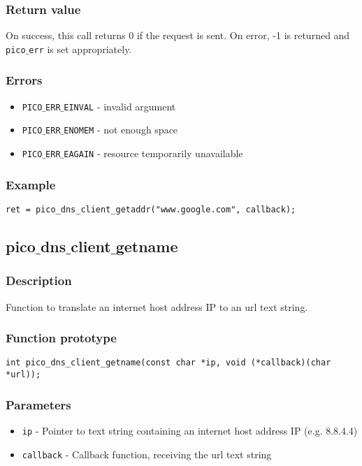 \subsubsection*{Return value}
On success, this call returns 0 if the request is sent.
On error, -1 is returned and \texttt{pico$\_$err} is set appropriately.

\subsubsection*{Errors}
\begin{itemize}[noitemsep]
\item \texttt{PICO$\_$ERR$\_$EINVAL} - invalid argument
\item \texttt{PICO$\_$ERR$\_$ENOMEM} - not enough space
\item \texttt{PICO$\_$ERR$\_$EAGAIN} - resource temporarily unavailable
\end{itemize}

\subsubsection*{Example}
\begin{verbatim}
ret = pico_dns_client_getaddr("www.google.com", callback);
\end{verbatim}



\subsection{pico$\_$dns$\_$client$\_$getname}

\subsubsection*{Description}
Function to translate an internet host address IP to an url text string.

\subsubsection*{Function prototype}
\begin{verbatim}
int pico_dns_client_getname(const char *ip, void (*callback)(char *url));
\end{verbatim}

\subsubsection*{Parameters}
\begin{itemize}[noitemsep]
\item \texttt{ip} - Pointer to text string containing an internet host address IP (e.g. 8.8.4.4)
\item \texttt{callback} - Callback function, receiving the url text string
\end{itemize}

